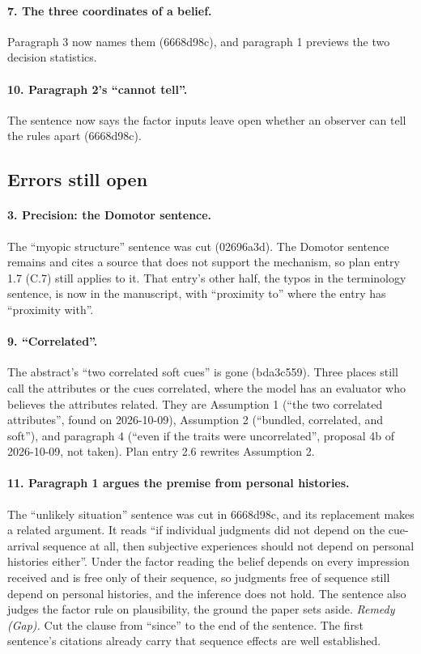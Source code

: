 \documentclass[11pt,a4paper]{article}
\begin{document}
\paragraph{7. The three coordinates of a belief.} Paragraph 3 now names them (6668d98c), and
paragraph 1 previews the two decision statistics.

\paragraph{10. Paragraph 2's ``cannot tell''.} The sentence now says the factor inputs leave open
whether an observer can tell the rules apart (6668d98c).

\subsection*{Errors still open}

\paragraph{3. Precision: the Domotor sentence.} The ``myopic structure'' sentence was cut
(02696a3d). The Domotor sentence remains and cites a source that does not support the mechanism,
so plan entry 1.7 (C.7) still applies to it. That entry's other half, the typos in the terminology
sentence, is now in the manuscript, with ``proximity to'' where the entry has ``proximity
with''.

\paragraph{9. ``Correlated''.} The abstract's ``two correlated soft cues'' is gone (bda3c559).
Three places still call the attributes or the cues correlated, where the model has an evaluator
who believes the attributes related. They are Assumption 1 (``the two correlated attributes'',
found on 2026-10-09), Assumption 2 (``bundled, correlated, and soft''), and paragraph 4 (``even if
the traits were uncorrelated'', proposal 4b of 2026-10-09, not taken). Plan entry 2.6 rewrites
Assumption 2.

\paragraph{11. Paragraph 1 argues the premise from personal histories.} The ``unlikely
situation'' sentence was cut in 6668d98c, and its replacement makes a related argument. It
reads ``if individual judgments did not depend on the cue-arrival sequence at all, then
subjective experiences should not depend on personal histories either''. Under the factor
reading the belief depends on every impression received and is free only of their sequence, so
judgments free of sequence still depend on personal histories, and the inference does not hold.
The sentence also judges the factor rule on plausibility, the ground the paper sets aside.
\emph{Remedy (Gap).} Cut the clause from ``since'' to the end of the sentence. The first
sentence's citations already carry that sequence effects are well established.
\end{document}
